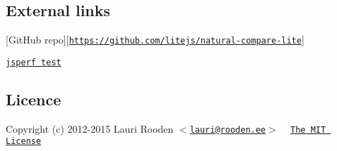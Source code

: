 \subsection*{External links }


\begin{DoxyItemize}
\item \mbox{[}Git\+Hub repo\mbox{]}\mbox{[}\href{https://github.com/litejs/natural-compare-lite}{\tt https\+://github.\+com/litejs/natural-\/compare-\/lite}\mbox{]}
\item \href{http://jsperf.com/natural-sort-2/12}{\tt jsperf test}
\end{DoxyItemize}

\subsection*{Licence }

Copyright (c) 2012-\/2015 Lauri Rooden $<$\href{mailto:lauri@rooden.ee}{\tt lauri@rooden.\+ee}$>$ ~\newline
\href{http://lauri.rooden.ee/mit-license.txt}{\tt The M\+IT License} 